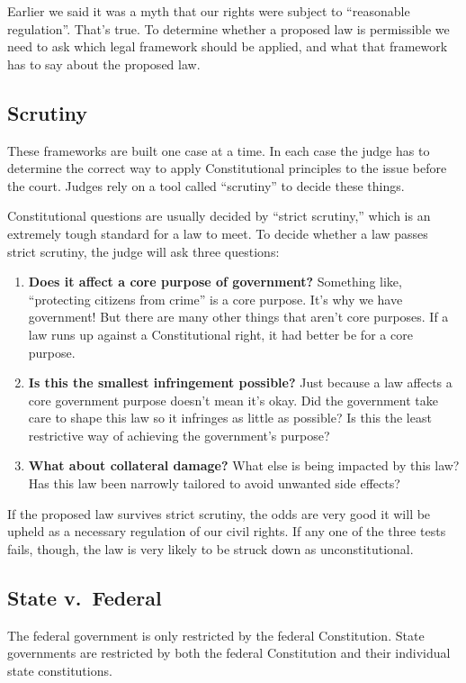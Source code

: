 \documentclass[10pt]{article}
\begin{document}
Earlier we said it was a myth that our rights were subject to ``reasonable regulation''.  That's true.  To determine whether a proposed law is permissible we need to ask which legal framework should be applied, and what that framework has to say about the proposed law.

\subsection{Scrutiny}
These frameworks are built one case at a time.  In each case the judge has to determine the correct way to apply Constitutional principles to the issue before the court.  Judges rely on a tool called ``scrutiny'' to decide these things.

Constitutional questions are usually decided by ``strict scrutiny,'' which is an extremely tough standard for a law to meet.  To decide whether a law passes strict scrutiny, the judge will ask three questions:

\begin{enumerate}
\item {\bf Does it affect a core purpose of government?}  Something like, ``protecting citizens from crime'' is a core purpose.  It's why we have government!  But there are many other things that aren't core purposes.  If a law runs up against a Constitutional right, it had better be for a core purpose.
\item {\bf Is this the smallest infringement possible?}  Just because a law affects a core government purpose doesn't mean it's okay.  Did the government take care to shape this law so it infringes as little as possible?  Is this the least restrictive way of achieving the government's purpose?
\item {\bf What about collateral damage?}  What else is being impacted by this law?  Has this law been narrowly tailored to avoid unwanted side effects?
\end{enumerate}

If the proposed law survives strict scrutiny, the odds are very good it will be upheld as a necessary regulation of our civil rights.  If any one of the three tests fails, though, the law is very likely to be struck down as unconstitutional.

\subsection{State v.~Federal}
The federal government is only restricted by the federal Constitution.  State governments are restricted by both the federal Constitution and their individual state constitutions.
\end{document}
